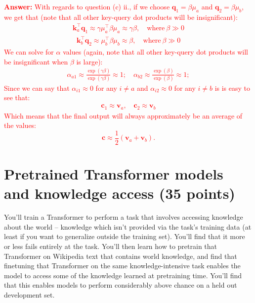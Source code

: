 \documentclass[letterpaper,12pt]{article}
\begin{document}
\begin{itemize}
		\textcolor{red}{\textbf{Answer:} With regards to question (c) ii., if we choose $\mathbf{q}_1 = \beta \mu_a$ and $\mathbf{q}_2 = \beta \mu_b$, we get that (note that all other key-query dot products will be insignificant):
		\begin{equation*}
			\begin{aligned}
				\mathbf{k}_a^\top \mathbf{q}_1 \approx \gamma \mu_a^\top \beta \mu_a \approx \gamma \beta, \quad \text{where} \ \beta \gg 0
			\end{aligned}
		\end{equation*}
		\begin{equation*}
			\begin{aligned}
				\mathbf{k}_b^\top \mathbf{q}_2 \approx \mu_b^\top \beta  \mu_b \approx \beta, \quad \text{where} \ \beta \gg 0
			\end{aligned}
		\end{equation*}
		We can solve for $\alpha$ values (again, note that all other key-query dot products will be insignificant when $\beta$ is large):
		\begin{equation*}
			\begin{aligned}
				\alpha_{a1} \approx \frac{\exp(\gamma\beta)}{\exp(\gamma\beta)} \approx 1; \quad \alpha_{b2} \approx \frac{\exp(\beta)}{\exp(\beta)} \approx 1;
			\end{aligned}
		\end{equation*}
		Since we can say that $\alpha_{i1} \approx 0$ for any $i\neq a$ and $\alpha_{i2} \approx 0$ for any $i\neq b$ is is easy to see that:
		\begin{equation*}
			\begin{aligned}
				\mathbf{c}_1 \approx \mathbf{v}_a, \quad \mathbf{c}_2 \approx \mathbf{v}_b
			\end{aligned}
		\end{equation*}
		Which means that the final output will always approximately be an average of the values:
		\begin{equation*}
			\mathbf{c} \approx \frac{1}{2} (\mathbf{v}_a + \mathbf{v}_b).
		\end{equation*}
		}
	\end{itemize}	
	
	\section{Pretrained Transformer models and knowledge access (35 points)}
	
	\noindent You'll train a Transformer to perform a task that involves accessing knowledge about the world – knowledge which isn't provided via the task's training data (at least if you want to generalize outside the training set). You'll find that it more or less fails entirely at the task. You'll then learn how to pretrain that Transformer on Wikipedia text that contains world knowledge, and find that finetuning that Transformer on the same knowledge-intensive task enables the model to access some of the knowledge learned at pretraining time. You'll find that this enables models to perform considerably above chance on a held out development set.
	
\end{document}
